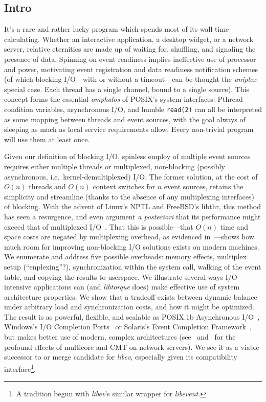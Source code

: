 \documentclass[letterpaper,10pt]{article}
\begin{document}
\begin{multicols}{2}
\section{Intro}
\label{sec:intro}
It's a rare and rather lucky program which spends most of its wall time
calculating. Whether an interactive application, a desktop widget, or a network
server, relative eternities are made up of waiting for, shuffling, and
signaling the presence of data. Spinning on event readiness implies ineffective
use of processor and power, motivating event registration and data readiness
notification schemes (of which blocking I/O---with or without a timeout---can be
thought the \textit{uniplex} special case. Each thread has a single channel,
bound to a single source). This concept forms the essential \textit{omphalos} of
POSIX's system interfaces: Pthread condition variables, asynchronous I/O, and
humble \texttt{read(2)} can all be interpreted as some mapping between threads
and event sources, with the goal always of sleeping as much as local service
requirements allow. Every non-trivial program will use them at least once.

Given our definition of blocking I/O, spinless employ of multiple event sources
requires either multiple threads or multiplexed, non-blocking (possibly
asynchronous, i.e.\ kernel-demultiplexed) I/O. The former solution, at the cost
of $O(n)$ threads and $O(n)$ context switches for $n$ event sources, retains
the simplicity and streamline (thanks to the absence of any multiplexing
interfaces) of blocking. With the advent of Linux's NPTL and FreeBSD's libthr,
this method has seen a resurgence, and even argument \textit{a posteriori}
that its performance might exceed that of multiplexed I/O~\cite{vonBehren03}.
That this is possible---that $O(n)$ time and space costs are negated by
multiplexing overhead, as evidenced in~\cite{Tyma08}---shows how much room for
improving non-blocking I/O solutions exists on modern machines. We enumerate and address five possible overheads:
memory effects, multiplex setup (``enplexing''?), synchronization within the system call,
walking of the event table, and copying the results to userspace. We illustrate
several ways I/O-intensive applications can (and \textit{libtorque} does) make
effective use of system architecture properties. We show that a tradeoff exists
between dynamic balance under arbitrary load and synchronization costs, and
how it might be optimized. The result is as powerful, flexible, and scalable as
POSIX.1b Asynchronous I/O~\cite{Posix1b}, Windows's I/O Completion Ports~\cite{Russinovich09}
or Solaris's Event Completion Framework~\cite{Solaris06}, but makes better use
of modern, complex architectures (see~\cite{Veal07} and~\cite{Guo08} for the
profound effects of multicore and CMT on network servers). We see it as a viable successor to or merge
candidate for \textit{libev}, especially given its compatibility interface\footnote{A
tradition begun with \textit{libev}'s similar wrapper for \textit{libevent}.}.


\end{multicols}
\end{document}
